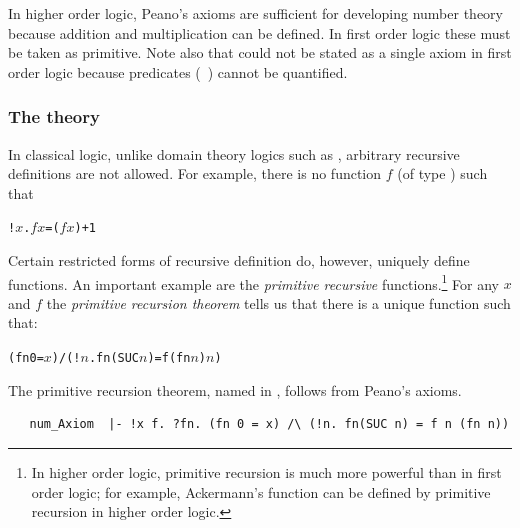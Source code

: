 In higher order logic, Peano's axioms are sufficient for developing
number theory because addition and multiplication can be defined. In
first order logic these must be taken as primitive.  Note also that
 could not be stated as a single axiom in first order
logic because predicates (\eg\ ) cannot be quantified.

\subsubsection{The theory }
\label{sec:prim-rec}

In classical logic, unlike domain theory logics such as \PPL,
%
%
arbitrary recursive definitions
%
%
are not allowed. For example, there is no function $f$ (of type
) such that

\begin{alltt}
   !\(x\). \(f\) \(x\) = (\(f\) \(x\)) + 1
\end{alltt}
Certain restricted forms of recursive
%
%
definition do, however, uniquely define functions. An important
example are the \emph{primitive recursive} functions.\footnote{In
  higher order logic, primitive recursion is much more powerful than
  in first order logic; for example, Ackermann's function can be
  defined by primitive recursion in higher order logic.} For any $x$
and $f$ the \emph{primitive recursion theorem} tells us that there is
a unique function  such that:

\begin{alltt}
   (fn 0 = \(x\)) /\bs (!\(n\). fn(SUC \(n\)) = f (fn \(n\)) \(n\))
\end{alltt}

The primitive recursion theorem, named  in \HOL,
follows from Peano's
%
%
axioms.

\begin{hol}
\begin{verbatim}
   num_Axiom  |- !x f. ?fn. (fn 0 = x) /\ (!n. fn(SUC n) = f n (fn n))
\end{verbatim}
\end{hol}

